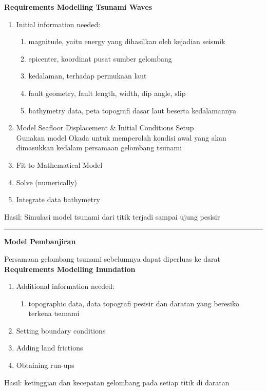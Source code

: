 \documentclass{article}
\begin{document}
\noindent\textbf{Requirements Modelling Tsunami Waves}
\begin{enumerate}
    \item Initial information needed:
    \begin{enumerate}
        \item magnitude, yaitu energy yang dihasilkan oleh kejadian seismik
        \item epicenter, koordinat pusat sumber gelombang
        \item kedalaman, terhadap permukaan laut
        \item fault geometry, fault length, width, dip angle, slip
        \item bathymetry data, peta topografi dasar laut beserta kedalamannya
    \end{enumerate}
    \item Model Seafloor Displacement \& Initial Conditions Setup\\
    Gunakan model Okada untuk memperolah kondisi awal yang akan dimasukkan kedalam persamaan gelombang tsunami
    \item Fit to Mathematical Model
    \item Solve (numerically)
    \item Integrate data bathymetry
\end{enumerate}
Hasil: Simulasi model tsunami dari titik terjadi sampai ujung pesisir

\vspace{0.5cm}\hrule height 2pt\vspace{0.5cm}
\begin{center}
    \textbf{Model Pembanjiran}
\end{center}
Persamaan gelombang tsunami sebelumnya dapat diperluas ke darat\\
\noindent\textbf{Requirements Modelling Inundation}
\begin{enumerate}
    \item Additional information needed:
    \begin{enumerate}
        \item topographic data, data topografi pesisir dan daratan yang beresiko terkena tsunami
    \end{enumerate}
    \item Setting boundary conditions
    \item Adding land frictions
    \item Obtaining run-ups
\end{enumerate}
Hasil: ketinggian dan kecepatan gelombang pada setiap titik di daratan
\end{document}

